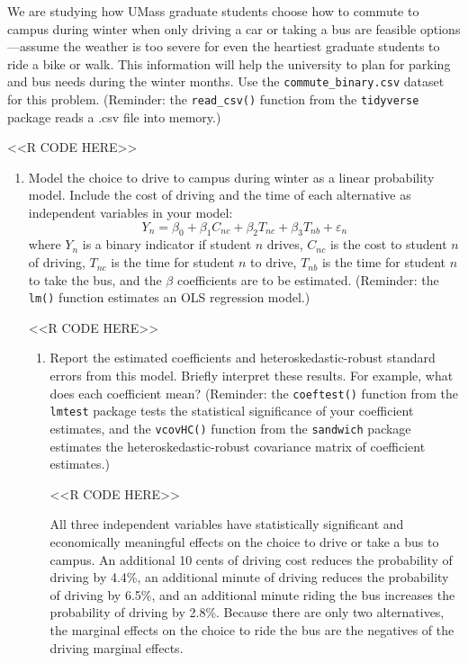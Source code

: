 \documentclass[11pt,letterpaper]{article}
\begin{document}
We are studying how UMass graduate students choose how to commute to campus during winter when only driving a car or taking a bus are feasible options---assume the weather is too severe for even the heartiest graduate students to ride a bike or walk. This information will help the university to plan for parking and bus needs during the winter months. Use the \texttt{commute\_binary.csv} dataset for this problem. (Reminder: the \texttt{read\_csv()} function from the \texttt{tidyverse} package reads a .csv file into memory.)

<<R CODE HERE>>

\begin{enumerate}[label=\alph*., leftmargin=*]
	\item Model the choice to drive to campus during winter as a linear probability model. Include the cost of driving and the time of each alternative as independent variables in your model:
	$$Y_n = \beta_0 + \beta_1 C_{nc} + \beta_2 T_{nc} + \beta_3 T_{nb} + \varepsilon_{n}$$
	where $Y_n$ is a binary indicator if student $n$ drives, $C_{nc}$ is the cost to student $n$ of driving, $T_{nc}$ is the time for student $n$ to drive, $T_{nb}$ is the time for student $n$ to take the bus, and the $\beta$ coefficients are to be estimated. (Reminder: the \texttt{lm()} function estimates an OLS regression model.)

	<<R CODE HERE>>

	\begin{enumerate}[label=\roman*.]
		\item Report the estimated coefficients and heteroskedastic-robust standard errors from this model. Briefly interpret these results. For example, what does each coefficient mean? (Reminder: the \texttt{coeftest()} function from the \texttt{lmtest} package tests the statistical significance of your coefficient estimates, and the \texttt{vcovHC()} function from the \texttt{sandwich} package estimates the heteroskedastic-robust covariance matrix of coefficient estimates.)

		<<R CODE HERE>>

		All three independent variables have statistically significant and economically meaningful effects on the choice to drive or take a bus to campus. An additional 10 cents of driving cost reduces the probability of driving by 4.4\%, an additional minute of driving reduces the probability of driving by 6.5\%, and an additional minute riding the bus increases the probability of driving by 2.8\%. Because there are only two alternatives, the marginal effects on the choice to ride the bus are the negatives of the driving marginal effects.


\end{enumerate}
\end{enumerate}
\end{document}
